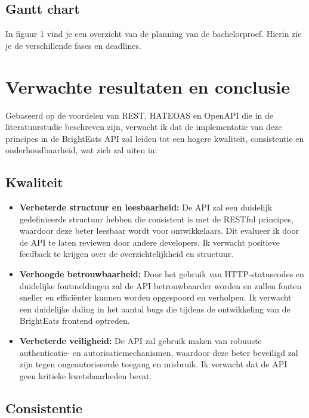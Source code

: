 \subsection{Gantt chart}

In figuur 1 vind je een overzicht van de planning van de bachelorproef. Hierin zie je de verschillende fases en deadlines.

\section{Verwachte resultaten en conclusie}%
\label{sec:verwachte_resultaten}

Gebaseerd op de voordelen van REST, HATEOAS en OpenAPI die in de literatuurstudie beschreven zijn, verwacht ik dat de implementatie van deze principes in de BrightEats API zal leiden tot een hogere kwaliteit, consistentie en onderhoudbaarheid, wat zich zal uiten in:

\subsection{Kwaliteit}

\begin{itemize}
    \item \textbf{Verbeterde structuur en leesbaarheid:} De API zal een duidelijk gedefinieerde structuur hebben die consistent is met de RESTful principes, waardoor deze beter leesbaar wordt voor ontwikkelaars. Dit evalueer ik door de API te laten reviewen door andere developers. Ik verwacht positieve feedback te krijgen over de overzichtelijkheid en structuur.
    \item \textbf{Verhoogde betrouwbaarheid:} Door het gebruik van HTTP-statuscodes en duidelijke foutmeldingen zal de API betrouwbaarder worden en zullen fouten sneller en efficiënter kunnen worden opgespoord en verholpen. Ik verwacht een duidelijke daling in het aantal bugs die tijdens de ontwikkeling van de BrightEats frontend optreden.
    \item \textbf{Verbeterde veiligheid:} De API zal gebruik maken van robuuste authenticatie- en autorisatiemechanismen, waardoor deze beter beveiligd zal zijn tegen ongeautoriseerde toegang en misbruik. Ik verwacht dat de API geen kritieke kwetsbaarheden bevat.
\end{itemize}

\subsection{Consistentie}


